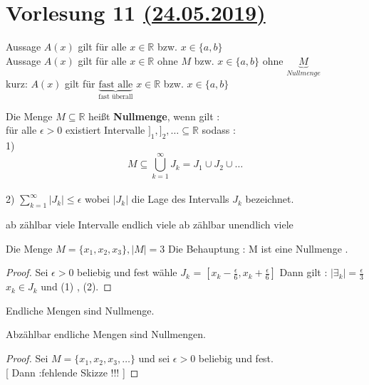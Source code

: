 \section{Vorlesung 11 \href{https://tu-dresden.de/mn/math/algebra/das-institut/beschaeftigte/antje-noack/ressourcen/dateien/v120-1/MathMethInf11.pdf?lang=en}{(24.05.2019)}}
\begin{remark}
Aussage $A(x)$ gilt für alle $x \in \mathbb{R}$ bzw. $x \in \{ a , b\}$\\
Aussage $A(x)$ gilt für alle $x \in \mathbb{R}$ ohne $ M$ bzw. $x \in \{ a , b \}$ ohne $\underbrace{M}_{Nullmenge} $\\
kurz: $A(x)$ gilt für $\underbrace{\text{fast alle}}_{\text{fast überall} }$ $x \in \mathbb{R}$ bzw. $x \in \{ a , b\} $  
\end{remark}
\begin{definition}[Nullmenge]
Die Menge $M \subseteq \mathbb{R}$ heißt \textbf{Nullmenge}, wenn gilt :\\
für alle $\epsilon > 0$ existiert Intervalle $ ]_1 , ]_2 , \dots \subseteq \mathbb{R}$ sodass :\\
1) $$ M \subseteq \bigcup_{k=1}^{\infty} J_k = J_1 \cup J_2 \cup \dots $$\\
2) $ \sum_{k=1}^{\infty}|J_k| \leq \epsilon$ wobei $|J_k|$ die Lage des Intervalls $J_k$ bezeichnet.
\end{definition}
\begin{remark}
ab zählbar viele Intervalle endlich viele
ab zählbar unendlich viele
\end{remark}
\begin{example}[1] 
Die Menge $ M = \{ x_1 , x_2 , x_3 \}, |M| = 3$ Die Behauptung : M ist eine Nullmenge .  
\end{example}
\begin{proof}
Sei $\epsilon > 0 $ beliebig und fest 
wähle $J_k$ = $[x_k - \frac{\epsilon}{6}, x_k + \frac{\epsilon}{6}]$
Dann gilt : $|\exists_k|=\frac{\epsilon}{3}$  $x_k \in J_k$ und (1) , (2).
\end{proof}  
\begin{remark}
Endliche Mengen sind Nullmenge.
\end{remark}
\begin{remark}
Abzählbar endliche Mengen sind Nullmengen.
\end{remark}
\begin{proof}
Sei $ M = \{ x_1 , x_2 , x_3 , \dots \}$ und sei $\epsilon > 0 $ beliebig und fest.\\



[ Dann :fehlende Skizze !!! ]
\end{proof}
